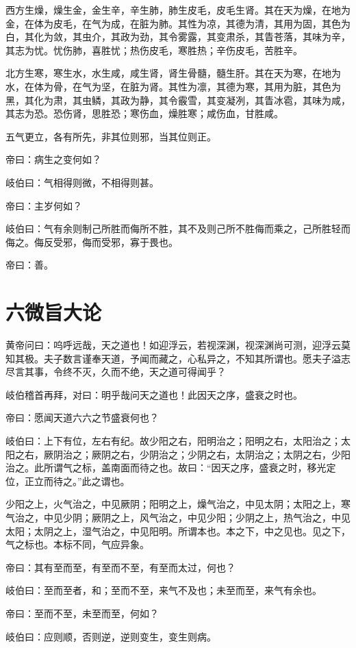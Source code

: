 \documentclass{article}%
\begin{document}
西方生燥，燥生金，金生辛，辛生肺，肺生皮毛，皮毛生肾。其在天为燥，在地为金，在体为皮毛，在气为成，在脏为肺。其性为凉，其德为清，其用为固，其色为白，其化为敛，其虫介，其政为劲，其令雾露，其变肃杀，其眚苍落，其味为辛，其志为忧。忧伤肺，喜胜忧；热伤皮毛，寒胜热；辛伤皮毛，苦胜辛。

北方生寒，寒生水，水生咸，咸生肾，肾生骨髓，髓生肝。其在天为寒，在地为水，在体为骨，在气为坚，在脏为肾。其性为凛，其德为寒，其用为脏，其色为黑，其化为肃，其虫鳞，其政为静，其令霰雪，其变凝冽，其眚冰雹，其味为咸，其志为恐。恐伤肾，思胜恐；寒伤血，燥胜寒；咸伤血，甘胜咸。

五气更立，各有所先，非其位则邪，当其位则正。

帝曰：病生之变何如？

岐伯曰：气相得则微，不相得则甚。

帝曰：主岁何如？

岐伯曰：气有余则制己所胜而侮所不胜，其不及则己所不胜侮而乘之，己所胜轻而侮之。侮反受邪，侮而受邪，寡于畏也。

帝曰：善。
\section{六微旨大论}
黄帝问曰：呜呼远哉，天之道也！如迎浮云，若视深渊，视深渊尚可测，迎浮云莫知其极。夫子数言谨奉天道，予闻而藏之，心私异之，不知其所谓也。愿夫子溢志尽言其事，令终不灭，久而不绝，天之道可得闻乎？

岐伯稽首再拜，对曰：明乎哉问天之道也！此因天之序，盛衰之时也。

帝曰：愿闻天道六六之节盛衰何也？

岐伯曰：上下有位，左右有纪。故少阳之右，阳明治之；阳明之右，太阳治之；太阳之右，厥阴治之；厥阴之右，少阴治之；少阴之右，太阴治之；太阴之右，少阳治之。此所谓气之标，盖南面而待之也。故曰：“因天之序，盛衰之时，移光定位，正立而待之。”此之谓也。

少阳之上，火气治之，中见厥阴；阳明之上，燥气治之，中见太阴；太阳之上，寒气治之，中见少阴；厥阴之上，风气治之，中见少阳；少阴之上，热气治之，中见太阳；太阴之上，湿气治之，中见阳明。所谓本也。本之下，中之见也。见之下，气之标也。本标不同，气应异象。

帝曰：其有至而至，有至而不至，有至而太过，何也？

岐伯曰：至而至者，和；至而不至，来气不及也；未至而至，来气有余也。

帝曰：至而不至，未至而至，何如？

岐伯曰：应则顺，否则逆，逆则变生，变生则病。
\end{document}
